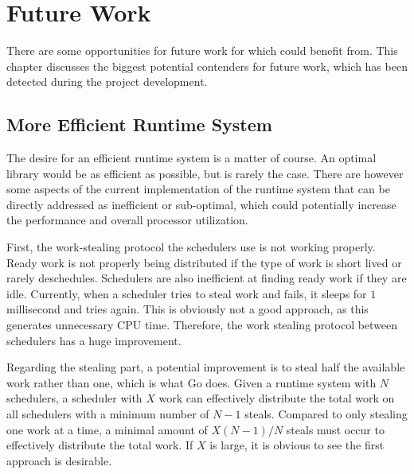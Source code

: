 

\chapter{Future Work}
\label{ch:future_work}


There are some opportunities for future work for which \Proxc{} could benefit from. This chapter discusses the biggest potential contenders for future work, which has been detected during the project development.


\section{More Efficient Runtime System}


The desire for an efficient runtime system is a matter of course. An optimal library would be as efficient as possible, but is rarely the case. There are however some aspects of the current implementation of the runtime system that can be directly addressed as inefficient or sub\hyp{}optimal, which could potentially increase the performance and overall processor utilization.

First, the work\hyp{}stealing protocol the schedulers use is not working properly. Ready work is not properly being distributed if the type of work is short lived or rarely deschedules. Schedulers are also inefficient at finding ready work if they are idle. Currently, when a scheduler tries to steal work and fails, it sleeps for $1$ millisecond and tries again. This is obviously not a good approach, as this generates unnecessary CPU time. Therefore, the work stealing protocol between schedulers has a huge improvement.

Regarding the stealing part, a potential improvement is to steal half the available work rather than one, which is what Go does. Given a runtime system with $N$ schedulers, a scheduler with $X$ work can effectively distribute the total work on all schedulers with a minimum number of $N-1$ steals. Compared to only stealing one work at a time, a minimal amount of $X(N-1)/N$ steals must occur to effectively distribute the total work. If $X$ is large, it is obvious to see the first approach is desirable.

